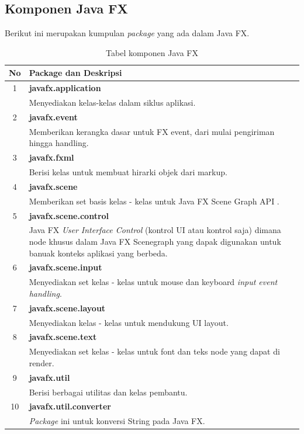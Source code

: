 \subsection{Komponen Java FX}
\label{subs:Komponen_Java_FX}
Berikut ini merupakan kumpulan \textit{package} yang ada dalam Java FX\cite{javafx3}.
\begin{table}[H]
		\centering
		\caption{Tabel komponen Java FX}
		\label{tab:komponen_javafx}
	\begin{tabular}{|c|p{12cm}|}
		\hline
		\textbf{No} & \textbf{Package dan Deskripsi} \\ \hline \hline
		1 & \textbf{javafx.application}\\
			&	Menyediakan kelas-kelas dalam siklus aplikasi.\\ \hline
		2 & \textbf{javafx.event}\\
			&	Memberikan kerangka dasar untuk FX event, dari mulai pengiriman hingga handling.\\ \hline	
		3 & \textbf{javafx.fxml}\\
			&	Berisi kelas untuk membuat hirarki objek dari markup.\\ \hline
		4 & \textbf{javafx.scene}\\
			&	Memberikan set basis kelas - kelas untuk Java FX Scene Graph API .\\ \hline
		5 & \textbf{javafx.scene.control}\\
			&	Java FX \textit{User Interface Control }(kontrol UI atau kontrol saja) dimana node khusus dalam Java FX Scenegraph yang dapak digunakan untuk banuak konteks aplikasi yang berbeda.\\ \hline
		6 & \textbf{javafx.scene.input}\\
			&	Menyediakan set kelas - kelas untuk mouse dan keyboard \textit{input event handling}.\\ \hline
		7 & \textbf{javafx.scene.layout}\\
			&	Menyediakan kelas - kelas untuk mendukung UI layout.\\ \hline
		8 & \textbf{javafx.scene.text}\\
			&	Menyediakan set kelas - kelas untuk font dan teks node yang dapat di render.\\ \hline
		9 & \textbf{javafx.util}\\
			&	Berisi berbagai utilitas dan kelas pembantu.\\ \hline
		10 & \textbf{javafx.util.converter}\\
			&	\textit{Package} ini untuk konversi String pada Java FX.\\ \hline

\end{tabular}
\end{table}
